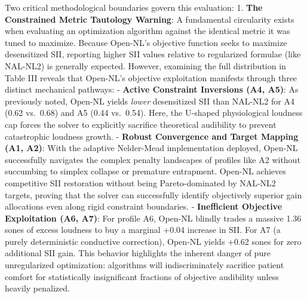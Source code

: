 \documentclass[
  12pt,
]{article}
\begin{document}
Two critical methodological boundaries govern this evaluation: 1.
\textbf{The Constrained Metric Tautology Warning}: A fundamental
circularity exists when evaluating an optimization algorithm against the
identical metric it was tuned to maximize. Because Open-NL's objective
function seeks to maximize desensitized SII, reporting higher SII values
relative to regularized formulae (like NAL-NL2) is generally expected.
However, examining the full distribution in Table III reveals that
Open-NL's objective exploitation manifests through three distinct
mechanical pathways: - \textbf{Active Constraint Inversions (A4, A5)}:
As previously noted, Open-NL yields \emph{lower} desensitized SII than
NAL-NL2 for A4 (0.62 vs.~0.68) and A5 (0.44 vs.~0.54). Here, the
U-shaped physiological loudness cap forces the solver to explicitly
sacrifice theoretical audibility to prevent catastrophic loudness
growth. - \textbf{Robust Convergence and Target Mapping (A1, A2)}: With
the adaptive Nelder-Mead implementation deployed, Open-NL successfully
navigates the complex penalty landscapes of profiles like A2 without
succumbing to simplex collapse or premature entrapment. Open-NL achieves
competitive SII restoration without being Pareto-dominated by NAL-NL2
targets, proving that the solver can successfully identify objectively
superior gain allocations even along rigid constraint boundaries. -
\textbf{Inefficient Objective Exploitation (A6, A7)}: For profile A6,
Open-NL blindly trades a massive 1.36 sones of excess loudness to buy a
marginal +0.04 increase in SII. For A7 (a purely deterministic
conductive correction), Open-NL yields +0.62 sones for zero additional
SII gain. This behavior highlights the inherent danger of pure
unregularized optimization: algorithms will indiscriminately sacrifice
patient comfort for statistically insignificant fractions of objective
audibility unless heavily penalized.
\end{document}
